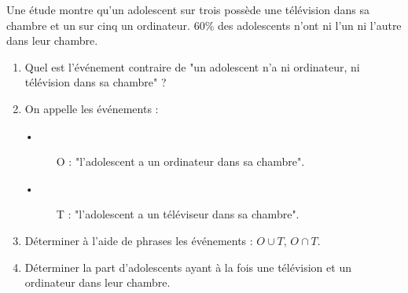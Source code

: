 
Une étude montre qu'un adolescent sur trois possède une télévision dans sa chambre et un sur cinq un ordinateur. 60\% des adolescents n'ont ni l'un ni l'autre dans leur chambre. 

\begin{enumerate}
\item Quel est l'événement contraire de "un adolescent n'a ni ordinateur, ni télévision dans sa chambre" ?
\item On appelle les événements :
\begin{description}
\item[•] O : "l'adolescent a un ordinateur dans sa chambre".
\item[•] T : "l'adolescent a un téléviseur dans sa chambre".
\end{description}
\item Déterminer à l'aide de phrases les événements : $O \cup T$,  $O \cap T$.
\item Déterminer la part d'adolescents ayant à la fois une télévision et un ordinateur dans leur chambre.
\end{enumerate}

